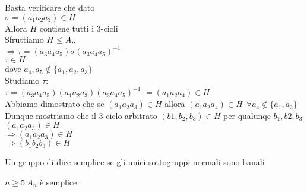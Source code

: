 \documentclass[12px]{article}
\begin{document}
	\begin{dimo}
		Basta verificare che dato \\
		$\sigma = (a_1a_2a_3)\in H$\\
		Allora $H$ contiene tutti i $3$-cicli\\
		Sfruttiamo $H\trianglelefteq A_n$\\
		$ \Rightarrow \tau = (a_3a_4a_5)\sigma(a_3a_4a_5)^{-1}$ \\
		$\tau\in H$\\
		dove  $a_4,a_5\not\in\{a_1,a_2,a_3\}$\\
		Studiamo $\tau:$\\
		$\tau = (a_3a_4a_5)(a_1a_2a_3)(a_3a_4a_5)^{-1}$ 
		$= (a_1a_2a_4)\in H$\\
		Abbiamo dimostrato che se $(a_1a_2a_3)\in H$ allora $(a_1a_2a_4)\in H \ \ \forall a_4\not\in\{a_1,a_2\}$\\
		Dunque mostriamo che il $3$-ciclo arbitrato $(b1,b_2,b_3)\in H$ per qualunqe $b_1,b2,b_3$\\
		$(a_1a_2a_3)\in H$\\
		$ \Rightarrow (a_1a_2a_3)\in H$\\
		$ \Rightarrow  (b_1b_2b_3)\in H$ \\

	\end{dimo}
	\begin{defi}
		Un gruppo di dice semplice se gli unici sottogruppi normali sono banali
	\end{defi}
	\begin{coro}
		$n\geq 5 \ A_n$ è semplice
	\end{coro}
\end{document}
